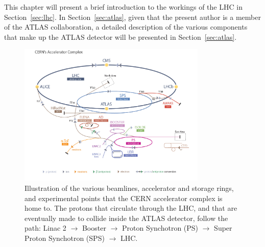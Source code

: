 This chapter will present a brief introduction to the workings of the LHC in Section~\ref{sec:lhc}.
In Section~\ref{sec:atlas}, given that the present author is a member of the ATLAS collaboration,
a detailed description of the various components that make up the ATLAS detector will be presented
in Section~\ref{sec:atlas}.



\begin{figure}[!htb]
    \begin{center}
        \includegraphics[width=0.8\textwidth]{figures/chapter2/cern_accelerator_complex2}
        \caption{
            Illustration of the various beamlines, accelerator and storage rings, and experimental
            points that the CERN accelerator complex is home to.
            The protons that circulate through the LHC, and that are eventually made to collide inside
            the ATLAS detector, follow the path: Linac 2 $\rightarrow$ Booster $\rightarrow$ Proton Synchotron (PS)
            $\rightarrow$ Super Proton Synchotron (SPS) $\rightarrow$ LHC.
        }
        \label{fig:cern_complex}
    \end{center}
\end{figure}


